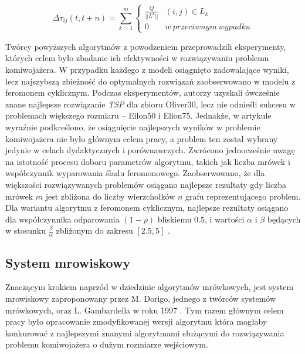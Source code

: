 {{{            \begin{equation}\label{eqt:pheromone-cycle}
                \Delta\tau_{ij}(t, t + n) = \sum_{k=1}^m \left\{
                        \begin{matrix}
                            \frac{Q}{||L^k||} & (i, j) \in L_k\\
                            0 & w\ przeciwnym\ wypadku
                        \end{matrix}
                    \right.
            \end{equation}

            Twórcy powyższych algorytmów z powodzeniem przeprowadzili eksperymenty, których celem było zbadanie ich
            efektywności w rozwiązywaniu problemu komiwojażera. W przypadku każdego z modeli osiągnięto zadowalające
            wyniki, lecz najszybszą zbieżność do optymalnych rozwiązań zaobserwowano w modelu z feromonem cyklicznym.
            Podczas eksperymentów, autorzy uzyskali ówcześnie znane najlepsze rozwiązanie \textit{TSP} dla zbioru
            Oliver30, lecz nie odnieśli sukcesu w problemach większego rozmiaru -- Eilon50 i Elion75. Jednakże, w
            artykule wyraźnie podkreślono, że osiągnięcie najlepszych wyników w problemie komiwojażera nie było głównym
            celem pracy, a problem ten został wybrany jedynie w celach dydaktycznych i porównawczych. Zwrócono
            jednocześnie uwagę na istotność procesu doboru parametrów algorytmu, takich jak liczba mrówek i współczynnik
            wyparowania śladu feromonowego. Zaobserwowano, że dla większości rozwiązywanych problemów osiągano najlepsze
            rezultaty gdy liczba mrówek $m$ jest zbliżona do liczby wierzchołków $n$ grafu reprezentującego problem. Dla
            wariantu algorytmu z feromonem cyklicznym, najlepsze rezultaty osiągano dla współczynnika odparowania $(1 -
            \rho)$ bliskiemu $0.5$, i wartości $\alpha$ i $\beta$ będących w stosunku $\frac{\beta}{\alpha}$ zbliżonym
            do zakresu $[2.5, 5]$  \cite{Dorigo1991AntSA}.
        }

        \subsection{System mrowiskowy}
        {
            Znaczącym krokiem naprzód w dziedzinie algorytmów mrówkowych, jest system mrowiskowy zaproponowany przez M.
            Dorigo, jednego z twórców systemów mrówkowych, oraz L. Gambardella w roku 1997 \cite{Dorigo1997AntCS}. Tym
            razem głównym celem pracy było opracowanie zmodyfikowanej wersji algorytmu która mogłaby konkurować z
            najlepszymi znanymi algorytmami służącymi do rozwiązywania problemu komiwojażera o dużym rozmiarze
            wejściowym.

}}}
